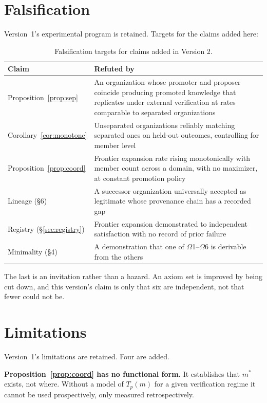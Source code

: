 \documentclass[11pt]{article}
\newcommand{\Tp}{\ensuremath{T_p}}
\begin{document}
\section{Falsification}

Version~1's experimental program is retained. Targets for the claims added here:

\begin{table}[h]
\centering\small
\begin{tabularx}{\textwidth}{@{}lX@{}}
\toprule
Claim & Refuted by \\
\midrule
Proposition~\ref{prop:sep} & An organization whose promoter and proposer coincide producing promoted knowledge that replicates under external verification at rates comparable to separated organizations \\
Corollary~\ref{cor:monotone} & Unseparated organizations reliably matching separated ones on held-out outcomes, controlling for member level \\
Proposition~\ref{prop:coord} & Frontier expansion rate rising monotonically with member count across a domain, with no maximizer, at constant promotion policy \\
Lineage (\S6) & A successor organization universally accepted as legitimate whose provenance chain has a recorded gap \\
Registry (\S\ref{sec:registry}) & Frontier expansion demonstrated to independent satisfaction with no record of prior failure \\
Minimality (\S4) & A demonstration that one of $\Omega$1--$\Omega$6 is derivable from the others \\
\bottomrule
\end{tabularx}
\caption{Falsification targets for claims added in Version 2.}
\end{table}

The last is an invitation rather than a hazard. An axiom set is improved by being cut down, and this version's claim is only that six are independent, not that fewer could not be.

\section{Limitations}

Version~1's limitations are retained. Four are added.

\textbf{Proposition~\ref{prop:coord} has no functional form.} It establishes that $m^*$ exists, not where. Without a model of $\Tp(m)$ for a given verification regime it cannot be used prospectively, only measured retrospectively.
\end{document}
